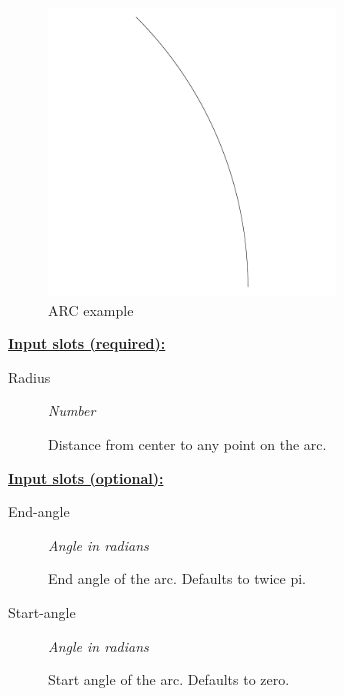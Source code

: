 \documentclass [11pt]{book}
\begin{document}
\begin{itemize}
\begin{figure}
\begin{center}
\includegraphics[width=3in,height=3in]{../images/example-arc.pdf}
\end{center}

\caption{ARC example}

\label{fig:ARC}

\end{figure}





\textbf{
\underline{Input slots (required):}}

\begin{description}

\item [Radius]
\emph{Number}

 Distance from center to any point on the arc.




\end{description}






\textbf{
\underline{Input slots (optional):}}

\begin{description}

\item [End-angle]
\emph{Angle in radians}

 End angle of the arc. Defaults to twice pi.




\item [Start-angle]
\emph{Angle in radians}

 Start angle of the arc. Defaults to zero.





\end{description}
\end{itemize}
\end{document}
